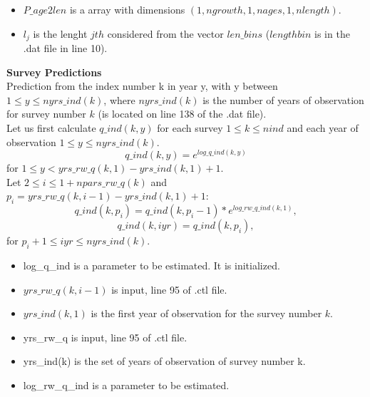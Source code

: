 \documentclass{article}
\begin{document}
\begin{itemize}
    \item $P\_age2len$ is a array with dimensions  $(1,ngrowth,1,nages,1,nlength)$.
\end{itemize}
\begin{itemize}
    \item $l_j$ is the lenght $jth$ considered from the vector $len\_bins$ ($lengthbin$ is in the .dat file in
    line 10).
\end{itemize}

\textbf{Survey Predictions}\\
Prediction from the index number k in year y, with y between $1\leq y \leq nyrs\_ind(k)$, where $nyrs\_ind(k)$ is the number of years of observation for survey number $k$ (is located on line 138 of the .dat file).\\
Let us first calculate $q\_ind(k,y)$ for each survey $1\leq k \leq nind$ and each year of observation $1\leq y \leq nyrs\_ind(k)$.
\begin{equation}
    q\_ind(k,y)=e^{log\_q\_ind(k,y)}
\end{equation}
for $1\leq y < yrs\_rw\_q(k,1)-yrs\_ind(k,1)+1$.\\

Let $2\leq i \leq 1+npars\_rw\_q(k)$ and $p_i=yrs\_rw\_q(k,i-1)-yrs\_ind(k,1)+1$:
\begin{equation}
     q\_ind(k,p_i)  = q\_ind(k,p_i-1)*e^{log\_rw\_q\_ind(k,1)},
\end{equation}
\begin{equation}
    q\_ind(k,iyr)  = q\_ind(k,p_i), 
\end{equation}
for $p_i+1\leq iyr \leq nyrs\_ind(k).$
\begin{itemize}
    \item log\_q\_ind is a parameter to be estimated. It is initialized.
    \item $yrs\_rw\_q(k,i-1)$ is input, line 95 of .ctl file.
    \item $yrs\_ind(k,1)$ is the first year of observation for the survey number $k$.
    \item yrs\_rw\_q is input, line 95 of .ctl file.
    \item yrs\_ind(k) is the set of years of observation of survey number k. 
    \item log\_rw\_q\_ind is a parameter to be estimated.
\end{itemize}
\end{document}
